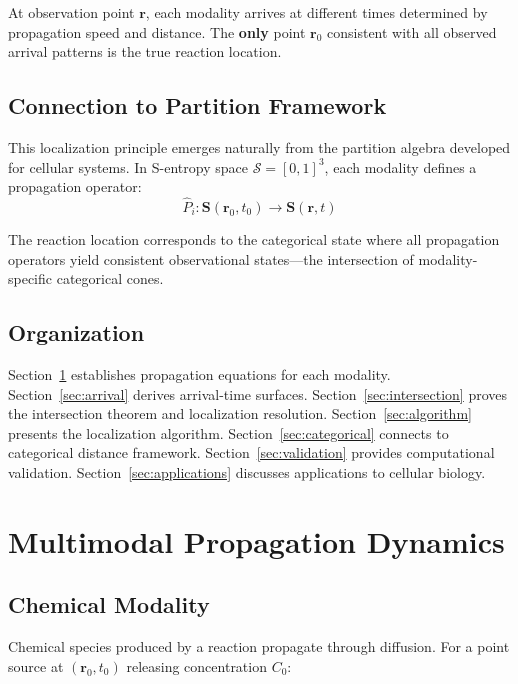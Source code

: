 \documentclass[11pt,a4paper]{article}
\theoremstyle{remark}
\newcommand{\Sspace}{\mathcal{S}}
\newcommand{\Scoord}{\mathbf{S}}
\newcommand{\rxnpos}{\mathbf{r}_0}
\newcommand{\rxntime}{t_0}
\newcommand{\obspos}{\mathbf{r}}
\begin{document}
At observation point $\obspos$, each modality arrives at different times determined by propagation speed and distance. The \textbf{only} point $\rxnpos$ consistent with all observed arrival patterns is the true reaction location.

\subsection{Connection to Partition Framework}

This localization principle emerges naturally from the partition algebra developed for cellular systems. In S-entropy space $\Sspace = [0,1]^3$, each modality defines a propagation operator:
\begin{equation}
    \hat{P}_i: \Scoord(\rxnpos, \rxntime) \to \Scoord(\obspos, t)
\end{equation}

The reaction location corresponds to the categorical state where all propagation operators yield consistent observational states---the intersection of modality-specific categorical cones.

\subsection{Organization}

Section~\ref{sec:propagation} establishes propagation equations for each modality. Section~\ref{sec:arrival} derives arrival-time surfaces. Section~\ref{sec:intersection} proves the intersection theorem and localization resolution. Section~\ref{sec:algorithm} presents the localization algorithm. Section~\ref{sec:categorical} connects to categorical distance framework. Section~\ref{sec:validation} provides computational validation. Section~\ref{sec:applications} discusses applications to cellular biology.

\section{Multimodal Propagation Dynamics}
\label{sec:propagation}

\subsection{Chemical Modality}

Chemical species produced by a reaction propagate through diffusion. For a point source at $(\rxnpos, \rxntime)$ releasing concentration $C_0$:
\end{document}
